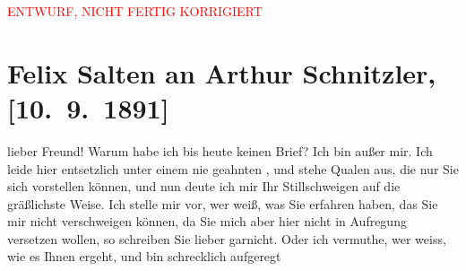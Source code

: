 
\begin{center}
            \textcolor{red}{ENTWURF, NICHT FERTIG KORRIGIERT}
                      \end{center}
            
         
         \renewcommand{\erwaehntePersonen}{Personen: Bertha Karlsburg, Felix Salten}
         \renewcommand{\erwaehnteOrte}{Orte: Hotel Stadt Pest, Miskolc, Wien}
         \renewcommand{\erwaehnteWerke}{}
               \section[Felix Salten an Arthur Schnitzler, {[}10. 9. 1891{]}]{ Felix Salten an Arthur Schnitzler, {[}10. 9. 1891{]}}\nopagebreak{}\rehead{ }\begin{ledgroupsized}[t]{13cm}\normalsize\beginnumbering{} \toendnotes[C]{\smallbreak\pagebreak[2]} 
\toendnotes[C]{\smallbreak}\pstart
           \noindent{}{\pb}lieber Freund! Warum habe ich bis heute keinen Brief? Ich bin außer mir. Ich leide hier entsetzlich unter einem
               nie geahnten \label{K_L03104-1v}\label{K_L03104-1h}, und stehe Qualen aus, die nur Sie sich vorstellen können, und nun deute ich
               mir Ihr Stillschweigen auf die gräßlichste Weise. Ich stelle mir vor, wer weiß, was
               Sie erfahren haben,  das Sie mir nicht verschweigen
               können, da Sie mich aber hier nicht in Aufregung
               versetzen wollen, so schreiben Sie lieber garnicht. Oder ich vermuthe, wer weiss, wie
               es Ihnen  ergeht, und bin schrecklich aufgeregt

\end{ledgroupsized}
